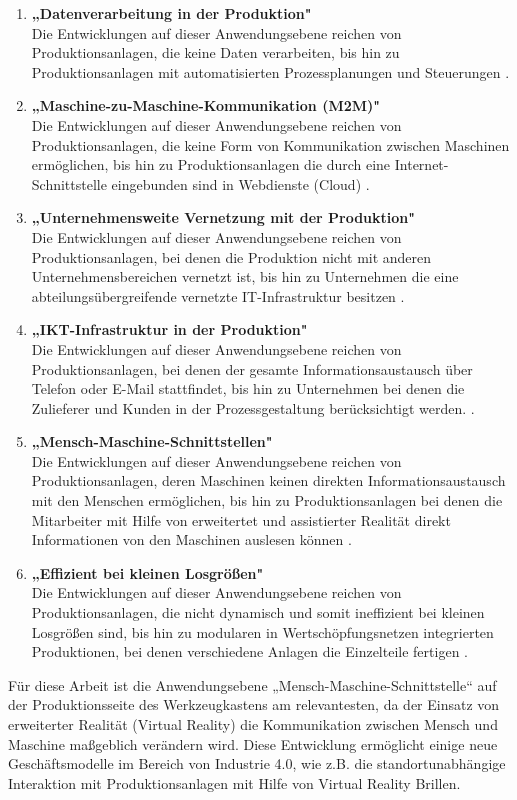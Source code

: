 \begin{enumerate}
	\item \textbf{„Datenverarbeitung in der Produktion"} \cite[S.15]{2} \\ Die Entwicklungen auf dieser Anwendungsebene reichen von Produktionsanlagen, die keine Daten verarbeiten, bis hin zu Produktionsanlagen mit automatisierten Prozessplanungen und Steuerungen \cite[S.15]{2}.
	\item \textbf{„Maschine-zu-Maschine-Kommunikation (M2M)"} \cite[S.15]{2} \\ Die Entwicklungen auf dieser Anwendungsebene reichen von Produktionsanlagen, die keine Form von Kommunikation zwischen Maschinen ermöglichen, bis hin zu Produktionsanlagen die durch eine Internet-Schnittstelle eingebunden sind in Webdienste (Cloud) \cite[S.15]{2}.
	\item \textbf{„Unternehmensweite Vernetzung mit der Produktion"} \cite[S.15]{2} \\ Die Entwicklungen auf dieser Anwendungsebene reichen von Produktionsanlagen, bei denen die Produktion nicht mit anderen Unternehmensbereichen vernetzt ist, bis hin zu Unternehmen die eine abteilungsübergreifende vernetzte IT-Infrastruktur besitzen \cite[S.15]{2}.
	\item \textbf{„IKT-Infrastruktur in der Produktion"} \cite[S.15]{2} \\ Die Entwicklungen auf dieser Anwendungsebene reichen von Produktionsanlagen, bei denen der gesamte Informationsaustausch über Telefon oder E-Mail stattfindet, bis hin zu Unternehmen bei denen die Zulieferer und Kunden in der Prozessgestaltung berücksichtigt werden. \cite[S.15]{2}.
	\item \textbf{„Mensch-Maschine-Schnittstellen"} \cite[S.15]{2} \\ Die Entwicklungen auf dieser Anwendungsebene reichen von Produktionsanlagen, deren Maschinen keinen direkten Informationsaustausch mit den Menschen ermöglichen, bis hin zu Produktionsanlagen bei denen die Mitarbeiter mit Hilfe von erweitertet und assistierter Realität direkt Informationen von den Maschinen auslesen können \cite[S.15]{2}.
	\item \textbf{„Effizient bei kleinen Losgrößen"} \cite[S.15]{2} \\ Die Entwicklungen auf dieser Anwendungsebene reichen von Produktionsanlagen, die nicht dynamisch und somit ineffizient bei kleinen Losgrößen sind, bis hin zu modularen in Wertschöpfungsnetzen integrierten Produktionen, bei denen verschiedene Anlagen die Einzelteile fertigen \cite[S.15]{2}.
\end{enumerate}
Für diese Arbeit ist die Anwendungsebene „Mensch-Maschine-Schnittstelle“ auf der Produktionsseite des Werkzeugkastens am relevantesten, da der Einsatz von erweiterter Realität (Virtual Reality) die Kommunikation zwischen Mensch und Maschine maßgeblich verändern wird. Diese Entwicklung ermöglicht einige neue Geschäftsmodelle im Bereich von Industrie 4.0, wie z.B. die standortunabhängige Interaktion mit Produktionsanlagen mit Hilfe von Virtual Reality Brillen.

